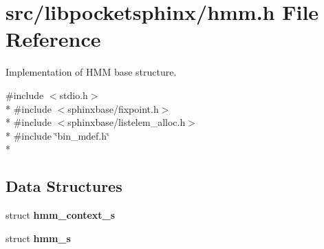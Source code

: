 \section{src/libpocketsphinx/hmm.h File Reference}
\label{hmm_8h}


Implementation of H\-M\-M base structure.  


{\ttfamily \#include $<$stdio.\-h$>$}\\*
{\ttfamily \#include $<$sphinxbase/fixpoint.\-h$>$}\\*
{\ttfamily \#include $<$sphinxbase/listelem\-\_\-alloc.\-h$>$}\\*
{\ttfamily \#include \char`\"{}bin\-\_\-mdef.\-h\char`\"{}}\\*
\subsection*{Data Structures}
\begin{DoxyCompactItemize}
\item 
struct {\bf hmm\-\_\-context\-\_\-s}
\item 
struct {\bf hmm\-\_\-s}
\end{DoxyCompactItemize}
